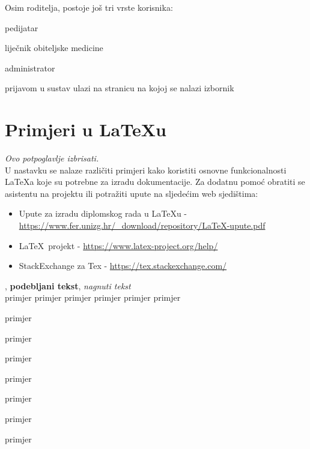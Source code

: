 		\noindent Osim roditelja, postoje još tri vrste korisnika:
		
		\begin{packed_item}
			
			\item  pedijatar
			\item  liječnik obiteljske medicine
			\item  administrator
			
		\end{packed_item}	
		
		 prijavom u sustav ulazi na stranicu na kojoj se nalazi izbornik 
		
		\section{Primjeri u \LaTeX u}
		
		\textit{Ovo potpoglavlje izbrisati.}\\

		U nastavku se nalaze različiti primjeri kako koristiti osnovne funkcionalnosti \LaTeX a koje su potrebne za izradu dokumentacije. Za dodatnu pomoć obratiti se asistentu na projektu ili potražiti upute na sljedećim web sjedištima:
		\begin{itemize}
			\item Upute za izradu diplomskog rada u \LaTeX u - \url{https://www.fer.unizg.hr/_download/repository/LaTeX-upute.pdf}
			\item \LaTeX\ projekt - \url{https://www.latex-project.org/help/}
			\item StackExchange za Tex - \url{https://tex.stackexchange.com/}\\
		
		\end{itemize} 	


		
		\noindent {}, \textbf{podebljani tekst}, 	\textit{nagnuti tekst}\\
		\noindent \normalsize primjer \large primjer \Large primjer \LARGE {primjer} \huge {primjer} \Huge primjer \normalsize
				
		\begin{packed_item}
			
			\item  primjer
			\item  primjer
			\item  primjer
			\item[] \begin{packed_enum}
				\item primjer
				\item[] \begin{packed_enum}
					\item[1.a] primjer
					\item[b] primjer
				\end{packed_enum}
				\item primjer
			\end{packed_enum}
			
		\end{packed_item}
		
